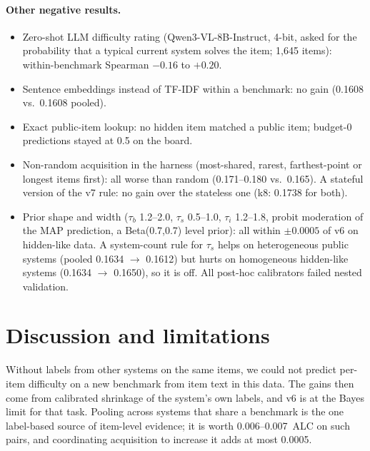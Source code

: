 \documentclass{article}
\begin{document}
\paragraph{Other negative results.}
\begin{itemize}
  \item Zero-shot LLM difficulty rating (Qwen3-VL-8B-Instruct, 4-bit, asked for the probability that a typical current system solves
        the item; 1{,}645 items): within-benchmark Spearman $-0.16$ to $+0.20$.
  \item Sentence embeddings instead of TF-IDF within a benchmark: no gain (0.1608 vs.\ 0.1608 pooled).
  \item Exact public-item lookup: no hidden item matched a public item; budget-0 predictions stayed at 0.5 on the board.
  \item Non-random acquisition in the harness (most-shared, rarest, farthest-point or longest items first): all worse than random
        (0.171--0.180 vs.\ 0.165). A stateful version of the v7 rule: no gain over the stateless one (k8: 0.1738 for both).
  \item Prior shape and width ($\tau_b$ 1.2--2.0, $\tau_s$ 0.5--1.0, $\tau_i$ 1.2--1.8, probit moderation of the MAP prediction,
        a Beta(0.7,0.7) level prior): all within $\pm 0.0005$ of v6 on hidden-like data. A system-count rule for $\tau_s$ helps on
        heterogeneous public systems (pooled 0.1634 $\to$ 0.1612) but hurts on homogeneous hidden-like systems (0.1634 $\to$ 0.1650),
        so it is off. All post-hoc calibrators failed nested validation.
\end{itemize}

\section{Discussion and limitations}
\label{sec:discussion}

Without labels from other systems on the same items, we could not predict per-item difficulty on a new benchmark from item text in
this data. The gains then come from calibrated shrinkage of the system's own labels, and v6 is at the Bayes limit for that task.
Pooling across systems that share a benchmark is the one label-based source of item-level evidence; it is worth 0.006--0.007~ALC on
such pairs, and coordinating acquisition to increase it adds at most 0.0005.
\end{document}
